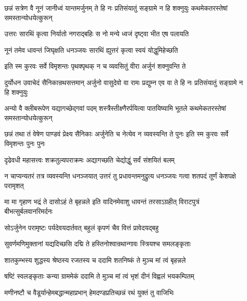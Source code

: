 \threelineshloka
{छन्नं सत्रेण वै नूनं जानीध्वं यान्तमर्जुनम्}
{ते हि नः प्रतिसंयातुं सङ्ग्रामे न हि शक्नुयुः}
{कथमेकतरस्तेषां समस्तान्योधयेत्कुरून्}


\twolineshloka
{उत्तरः सारथिं कृत्वा निर्यातो नगराद्बहिः}
{स नो मन्ये ध्वजं दृष्ट्वा भीत एष पलायति}




\twolineshloka
{नूनं तमेव धावन्तं जिघृक्षति धनञ्जयः}
{सारथिं ह्युत्तरं कृत्वा स्वयं योद्धुमिहेच्छति}



\twolineshloka
{इति स्म कुरवः सर्वे विमृशन्तः पृथक्पृथक्}
{न च व्यवसितुं वीरा अर्जुनं शक्नुवन्ति ते}


\threelineshloka
{दुर्योधन उवाचेदं सैनिकान्रथसत्तमान्}
{अर्जुनो वासुदेवो वा रामः प्रद्युम्न एव वा}
{ते हि नः प्रतिसंयातुं सङ्ग्रामे न हि शक्नुयुः}


\threelineshloka
{अन्यो वै क्लीबरूपेण यद्यागच्छेद्गवां पदम्}
{शस्त्रैस्तीक्ष्णैरर्पयित्वा पातयिष्यामि भूतले}
{कथमेकतरस्तेषां समस्तान्योधयेत्कुरून्}



\threelineshloka
{छन्नं तथा तं वेषेण पाण्डवं प्रेक्ष्य सैनिकाः}
{अर्जुनेति च नेत्येव न व्यवस्यन्ति ते पुनः}
{इति स्म कुरवः सर्वे विमृशन्तः पुनः पुनः}


\twolineshloka
{दृढेवधी महासत्त्वः शक्रतुल्यपराक्रमः}
{अद्यागच्छति चेद्योद्धुं सर्वं संशयितं बलम्}


\onelineshloka
{न चाप्यन्यतरं तत्र व्यवस्यन्ति धनञ्जयात्}
\twolineshloka
{उत्तरं तु प्रधावन्तमनुद्रुत्य धनञ्जयः}
{गत्वा शतपदं तूर्णं केशपक्षे परामृशत्}


\threelineshloka
{मा मा गृहाण भद्रं ते दासोऽहं ते बृहन्नले}
{इति वादिनमेवाशु धावन्तं तरसाऽग्रहीत्}
{विराटपुत्रं बीभत्सुर्बलवानरिमर्दनः}


\twolineshloka
{सोऽर्जुनेन परामृष्टः पर्यदेवयदार्तवत्}
{बहुलं कृपणं चैव वित्तं प्रावेदयद्बहु}


\twolineshloka
{सुवर्णमणिमुक्तानां यद्यदिच्छसि दद्मि ते}
{हस्तिनोश्वान्रथान्गावः स्त्रियश्च समलङ्कृताः}


\twolineshloka
{शातकुम्भस्य शुद्धस्य श्रेष्ठस्य रजतस्य च}
{ददामि शतनिष्कं ते मुञ्च मां त्वं बृहन्नले}


\twolineshloka
{षष्टिं स्वलङ्कृताः कन्या ग्राममेकं ददामि ते}
{मुञ्च मां त्वं भृशं दीनं विह्वलं भयकम्पितम्}


\twolineshloka
{मणीनष्टौ च वैडूर्यान्हेमबद्धान्महाप्रभान्}
{हेमदण्डप्रतिच्छन्नं रथं युक्तं तु वाजिभिः}


